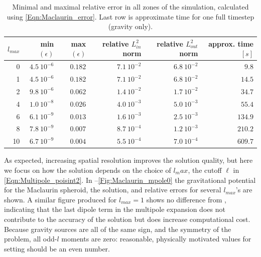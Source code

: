 \begin{table}[!ht]
	\centering
		\begin{tabular}{|r|r|r|r|r|r|}
			\hline
      $l_{max}$&min$(\epsilon)$&max$(\epsilon)$&relative $L^2_{in}$ norm& relative $L^2_{out}$ norm&approx. time $[s]$\\
      \hline
      0&$4.5\ 10^{-6}$&$0.182$&$7.1\ 10^{-2}$&$6.8\ 10^{-2}$&$9.8$\\
      1&$4.5\ 10^{-6}$&$0.182$&$7.1\ 10^{-2}$&$6.8\ 10^{-2}$&$14.5$\\
      2&$9.8\ 10^{-6}$&$0.062$&$1.4\ 10^{-2}$&$1.7\ 10^{-2}$&$34.7$\\
      4&$1.0\ 10^{-8}$&$0.026$&$4.0\ 10^{-3}$&$5.0\ 10^{-3}$&$55.4$\\
      6&$6.1\ 10^{-9}$&$0.013$&$1.6\ 10^{-3}$&$2.5\ 10^{-3}$&$134.9$\\
      8&$7.8\ 10^{-9}$&$0.007$&$8.7\ 10^{-4}$&$1.2\ 10^{-3}$&$210.2$\\
      10&$6.7\ 10^{-9}$&$0.004$&$5.5\ 10^{-4}$&$7.0\ 10^{-4}$&$609.7$\\
      \hline
		\end{tabular}
	\caption{Minimal and maximal relative error in all zones of the simulation, calculated 
	         using \eqref{Eqn:Maclaurin_error}. Last row is approximate time for one full timestep (gravity only).}
	\label{tab:multipoles}
\end{table}

As expected, increasing spatial resolution improves the solution quality, but here we focus on 
how the solution depends on the choice of $l_max$, the cutoff 
$\ell$ in \eqref{Eqn:Multipole_poisint2}. In --\ref{Fig:Maclaurin_mpole0}
the gravitational potential for the Maclaurin 
spheroid, the \flashx solution, and relative errors for several $l_{max}$'s are shown. 
A similar figure produced for $l_{max}=1$ shows no difference from ,
indicating that the last dipole term in the multipole expansion does not contribute to the accuracy
of the solution but does increase computational cost.
Because gravity sources are all of the same sign, and the symmetry of the 
problem, all odd-$l$ moments are zero: reasonable, physically motivated values for 
setting  should be an even number. 

